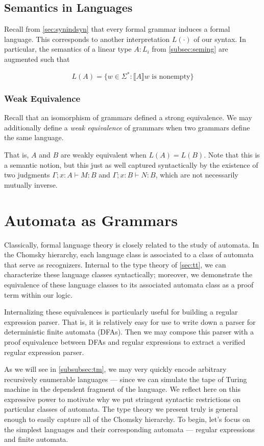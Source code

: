 \documentclass[acmsmall,screen,nonacm]{acmart}
\newcommand{\sem}[1]{\llbracket{#1}\rrbracket}
\newcommand{\String}{\Sigma^{*}}
\begin{document}
\subsection{Semantics in Languages}
Recall from \cref{sec:synindsyn} that every formal grammar induces a formal language. This corresponds to another
interpretation $L(\cdot)$ of our syntax. In particular, the semantics of a
linear type $A : L_{i}$
from \cref{subsec:seming} are augmented such that

\[
  L(A) = \{ w \in \String : \sem A w \text{ is nonempty} \}
\]

\subsubsection{Weak Equivalence}
Recall that an isomorphism of grammars defined a strong equivalence. We may
additionally define a \emph{weak equivalence} of grammars when two grammars
define the same language.

That is, $A$ and $B$ are weakly equivalent when $L(A) = L(B)$. Note that this is
a semantic notion, but this just as well captured syntactically by the existence
of two judgments $\Gamma ; x : A \vdash M : B$ and
$\Gamma ; x : B \vdash N : B$, which are not necessarily mutually inverse.

\section{Automata as Grammars}
Classically, formal language theory is closely related to the study of automata.
In the Chomsky hierarchy, each language class is associated to a class of
automata that serve as recognizers. Internal to the type theory of \cref{sec:tt},
we can characterize these language classes syntactically; moreover, we
demonstrate the equivalence of these language classes to its associated automata class as a
proof term within our logic.

Internalizing these equivalences is particularly useful for building a regular
expression parser. That is, it is relatively easy for use to write down a parser
for deterministic finite automata (DFAs). Then we may compose this parser with
a proof equivalence between DFAs and regular expressions to extract a verified
regular expression parser.

As we will see in \cref{subsubsec:tm}, we may very quickly encode arbitrary
recursively enumerable languages --- since we can simulate the
tape of Turing machine in the dependent fragment of the language. We reflect
here on this expressive power to motivate why we put stringent syntactic
restrictions on particular classes of automata. The type theory we present truly
is general enough to easily capture all of the Chomsky hierarchy.
To begin, let's focus on the simplest languages and their corresponding
automata --- regular expressions and finite automata.
\end{document}
